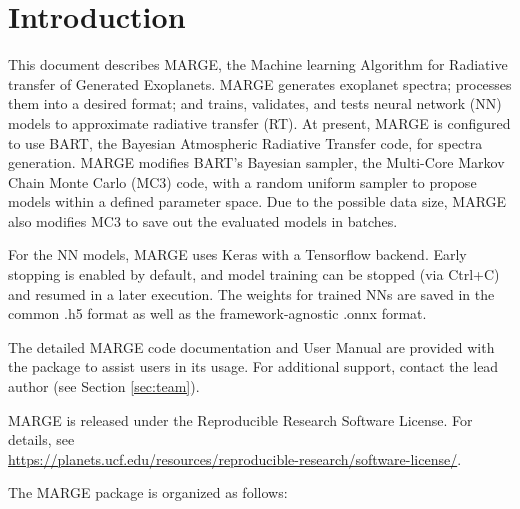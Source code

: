 \documentclass[letterpaper, 12pt]{article}
\begin{document}
\section{Introduction}
\label{sec:theory}

\noindent This document describes MARGE, the Machine learning Algorithm for 
Radiative transfer of Generated Exoplanets.  MARGE generates exoplanet spectra; 
processes them into a desired format; and trains, validates, and tests neural 
network (NN) models to approximate radiative transfer (RT).  At present, MARGE 
is configured to use BART, the Bayesian Atmospheric Radiative Transfer code, 
for spectra generation.  MARGE modifies BART's Bayesian sampler, the Multi-Core 
Markov Chain Monte Carlo (MC3) code, with a random uniform sampler to propose 
models within a defined parameter space.  Due to the possible data size, MARGE 
also modifies MC3 to save out the evaluated models in batches.  

For the NN models, MARGE uses Keras with a Tensorflow backend.  Early stopping 
is enabled by default, and model training can be stopped (via Ctrl+C) and 
resumed in a later execution.  The weights for trained NNs are saved in the 
common .h5 format as well as the framework-agnostic .onnx format.

The detailed MARGE code documentation and User Manual are provided 
with the package to assist users in its usage. For additional support, contact 
the lead author (see Section \ref{sec:team}).

MARGE is released under the Reproducible Research Software License.  
For details, see \\
\href{https://planets.ucf.edu/resources/reproducible-research/software-license/}{https://planets.ucf.edu/resources/reproducible-research/software-license/}.
\newline

\noindent The MARGE package is organized as follows: \newline
\noindent{}
\vspace{0.7cm}
\end{document}
